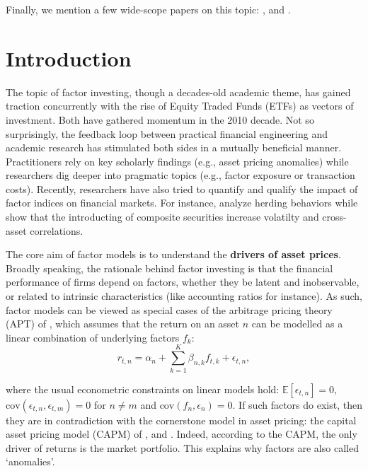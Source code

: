 \documentclass[]{krantz}
\theoremstyle{definition}
\theoremstyle{definition}
\theoremstyle{definition}
\theoremstyle{remark}
\begin{document}
Finally, we mention a few wide-scope papers on this topic:
\citet{goyal2012empirical}, \citet{cazalet2014facts} and
\citet{baz2015dissecting}.

\hypertarget{introduction}{%
\section{Introduction}\label{introduction}}

The topic of factor investing, though a decades-old academic theme, has
gained traction concurrently with the rise of Equity Traded Funds (ETFs)
as vectors of investment. Both have gathered momentum in the 2010
decade. Not so surprisingly, the feedback loop between practical
financial engineering and academic research has stimulated both sides in
a mutually beneficial manner. Practitioners rely on key scholarly
findings (e.g., asset pricing anomalies) while researchers dig deeper
into pragmatic topics (e.g., factor exposure or transaction costs).
Recently, researchers have also tried to quantify and qualify the impact
of factor indices on financial markets. For instance,
\citet{krkoska2019herding} analyze herding behaviors while
\citet{cong2019rise} show that the introducting of composite securities
increase volatilty and cross-asset correlations.

The core aim of factor models is to understand the \textbf{drivers of
asset prices}. Broadly speaking, the rationale behind factor investing
is that the financial performance of firms depend on factors, whether
they be latent and inobservable, or related to intrinsic characteristics
(like accounting ratios for instance). As such, factor models can be
viewed as special cases of the arbitrage pricing theory (APT) of
\citet{ross1976arbitrage}, which assumes that the return on an asset
\(n\) can be modelled as a linear combination of underlying factors
\(f_k\): \begin{equation}
\label{eq:apt}
r_{t,n}= \alpha_n+\sum_{k=1}^K\beta_{n,k}f_{t,k}+\epsilon_{t,n}, 
\end{equation}

where the usual econometric constraints on linear models hold:
\(\mathbb{E}[\epsilon_{t,n}]=0\),
\(\text{cov}(\epsilon_{t,n},\epsilon_{t,m})=0\) for \(n\neq m\) and
\(\text{cov}(f_n,\epsilon_n)=0\). If such factors do exist, then they
are in contradiction with the cornerstone model in asset pricing: the
capital asset pricing model (CAPM) of \citet{sharpe1964capital},
\citet{lintner1965valuation} and \citet{mossin1966equilibrium}. Indeed,
according to the CAPM, the only driver of returns is the market
portfolio. This explains why factors are also called `anomalies'.
\end{document}
